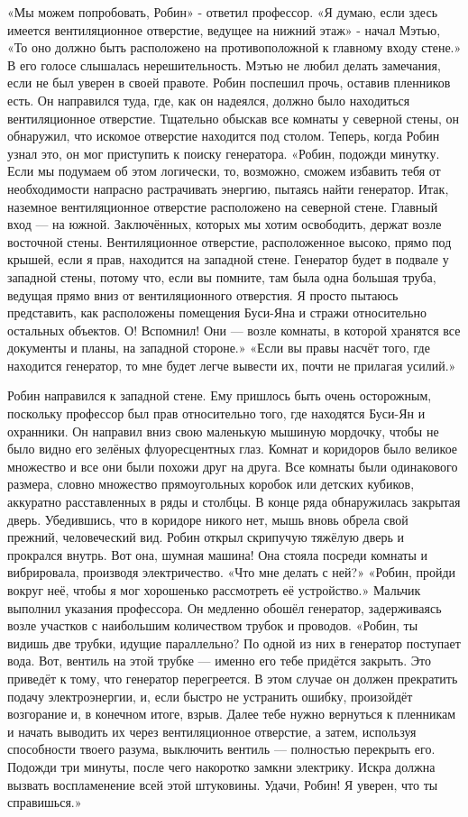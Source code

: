 \documentclass[a4paper,12pt]{book}
\begin{document}
	«Мы можем попробовать, Робин» - ответил профессор.
	«Я думаю, если здесь имеется вентиляционное отверстие, ведущее на нижний этаж» - начал Мэтью,
	«То оно должно быть расположено на противоположной к главному входу стене.»
	В его голосе слышалась нерешительность. Мэтью не любил делать замечания, если не был уверен в своей правоте.
	Робин поспешил прочь, оставив пленников есть. Он направился туда, где, как он надеялся, должно было находиться вентиляционное отверстие. Тщательно обыскав все комнаты у северной стены, он обнаружил, что искомое отверстие находится под столом. Теперь, когда Робин узнал это, он мог приступить к поиску генератора.
	«Робин, подожди минутку. Если мы подумаем об этом логически, то, возможно, сможем избавить тебя от необходимости напрасно растрачивать энергию, пытаясь найти генератор. Итак, наземное вентиляционное отверстие расположено на северной стене. Главный вход — на южной. Заключённых, которых мы хотим освободить, держат возле восточной стены. Вентиляционное отверстие, расположенное высоко, прямо под крышей, если я прав, находится на западной стене. Генератор будет в подвале у западной стены, потому что, если вы помните, там была одна большая труба, ведущая прямо вниз от вентиляционного отверстия. Я просто пытаюсь представить, как расположены помещения Буси-Яна и стражи относительно остальных объектов. О! Вспомнил! Они — возле комнаты, в которой хранятся все документы и планы, на западной стороне.»
	«Если вы правы насчёт того, где находится генератор, то мне будет легче вывести их, почти не прилагая усилий.»

	Робин направился к западной стене. Ему пришлось быть очень осторожным, поскольку профессор был прав относительно того, где находятся Буси-Ян и охранники. Он направил вниз свою маленькую мышиную мордочку, чтобы не было видно его зелёных флуоресцентных глаз.
	Комнат и коридоров было великое множество и все они были похожи друг на друга. Все комнаты были одинакового размера, словно множество прямоугольных коробок или детских кубиков, аккуратно расставленных в ряды и столбцы. В конце ряда обнаружилась закрытая дверь. Убедившись, что в коридоре никого нет, мышь вновь обрела свой прежний, человеческий вид. Робин открыл скрипучую тяжёлую дверь и прокрался внутрь. Вот она, шумная машина! Она стояла посреди комнаты и вибрировала, производя электричество.
	«Что мне делать с ней?»
	«Робин, пройди вокруг неё, чтобы я мог хорошенько рассмотреть её устройство.»
	Мальчик выполнил указания профессора. Он медленно обошёл генератор, задерживаясь возле участков с наибольшим количеством трубок и проводов.
	«Робин, ты видишь две трубки, идущие параллельно? По одной из них в генератор поступает вода. Вот, вентиль на этой трубке — именно его тебе придётся закрыть. Это приведёт к тому, что генератор перегреется. В этом случае он должен прекратить подачу электроэнергии, и, если быстро не устранить ошибку, произойдёт возгорание и, в конечном итоге, взрыв. Далее тебе нужно вернуться к пленникам и начать выводить их через вентиляционное отверстие, а затем, используя способности твоего разума, выключить вентиль — полностью перекрыть его. Подожди три минуты, после чего накоротко замкни электрику. Искра должна вызвать воспламенение всей этой штуковины. Удачи, Робин! Я уверен, что ты справишься.»
\end{document}
